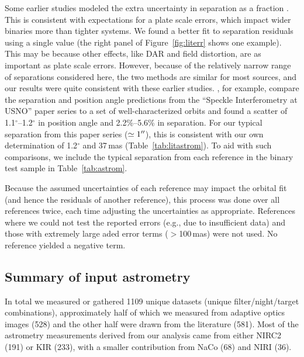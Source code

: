 \documentclass[twocolumn]{aastex62}
\begin{document}
Some earlier studies modeled the extra uncertainty in separation as a fraction \citep[e.g.,][]{Hrt2008,Hor2011,Tok2012d}. This is consistent with expectations for a plate scale errors, which impact wider binaries more than tighter systems. We found a better fit to separation residuals using a single value (the right panel of Figure~\ref{fig:literr} shows one example). This may be because other effects, like DAR and field distortion, are as important as plate scale errors. However, because of the relatively narrow range of separations considered here, the two methods are similar for most sources, and our results were quite consistent with these earlier studies. \citet{2007AJ....134.1671M}, for example, compare the separation and position angle predictions from the ``Speckle Interferometry at USNO'' paper series to a set of well-characterized orbits and found a scatter of 1.1$^{\circ}$--1.2$^{\circ}$ in position angle and 2.2\%--5.6\% in separation. For our typical separation from this paper series ($\simeq1\mbox{$^{\prime\prime}$}$), this is consistent with our own determination of 1.2$^{\circ}$ and 37\,mas (Table~\ref{tab:litastrom}). To aid with such comparisons, we include the typical separation from each reference in the binary test sample in Table~\ref{tab:astrom}.

Because the assumed uncertainties of each reference may impact the orbital fit (and hence the residuals of another reference), this process was done over all references twice, each time adjusting the uncertainties as appropriate. References where we could not test the reported errors (e.g., due to insufficient data) and those with extremely large aded error terms ($>$100\,mas) were not used. No reference yielded a negative term. 

\subsection{Summary of input astrometry}

In total we measured or gathered 1109 unique datasets (unique filter/night/target combinations), approximately half of which we measured from adaptive optics images (528) and the other half were drawn from the literature (581). Most of the astrometry measurements derived from our analysis came from either NIRC2 (191) or KIR (233), with a smaller contribution from NaCo (68) and NIRI (36). 
\end{document}
